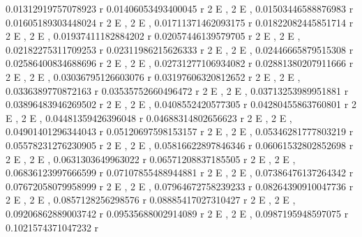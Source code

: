 \documentclass[a4paper,10pt]{article}
\begin{document}
\begin{eulernotebook}
\begin{eulercomment}
\begin{eulercomment}
\begin{eulercomment}
\begin{eulercomment}
\begin{eulercomment}
\begin{eulercomment}
\begin{eulercomment}
\begin{eulercomment}
\begin{eulercomment}
\begin{eulercomment}
\begin{eulercomment}
\begin{eulercomment}
\begin{eulercomment}
\begin{eulercomment}
\begin{eulercomment}
\begin{eulercomment}
\begin{eulercomment}
\begin{eulercomment}
\begin{eulercomment}
\begin{eulercomment}
\begin{eulercomment}
\begin{eulercomment}
\begin{eulercomment}
\begin{eulercomment}
\begin{euleroutput}
     0.01312919757078923 r     0.01406053493400045 r
  2 E                     , 2 E                     , 
     0.01503446588876983 r     0.01605189303448024 r
  2 E                     , 2 E                     , 
     0.01711371462093175 r     0.01822082445851714 r
  2 E                     , 2 E                     , 
     0.01937411182884202 r     0.02057446139579705 r
  2 E                     , 2 E                     , 
     0.02182275311709253 r     0.02311986215626333 r
  2 E                     , 2 E                     , 
     0.02446665879515308 r     0.02586400834688696 r
  2 E                     , 2 E                     , 
     0.02731277106934082 r     0.02881380207911666 r
  2 E                     , 2 E                     , 
     0.03036795126603076 r     0.03197606320812652 r
  2 E                     , 2 E                     , 
     0.0336389770872163 r     0.03535752660496472 r
  2 E                    , 2 E                     , 
     0.03713253989951881 r     0.03896483946269502 r
  2 E                     , 2 E                     , 
     0.0408552420577305 r     0.04280455863760801 r
  2 E                    , 2 E                     , 
     0.04481359426396048 r     0.04688314802656623 r
  2 E                     , 2 E                     , 
     0.04901401296344043 r     0.05120697598153157 r
  2 E                     , 2 E                     , 
     0.05346281777803219 r     0.05578231276230905 r
  2 E                     , 2 E                     , 
     0.05816622897846346 r     0.06061532802852698 r
  2 E                     , 2 E                     , 
     0.0631303649963022 r     0.06571208837185505 r
  2 E                    , 2 E                     , 
     0.06836123997666599 r     0.07107855488944881 r
  2 E                     , 2 E                     , 
     0.07386476137264342 r     0.07672058079958999 r
  2 E                     , 2 E                     , 
     0.07964672758239233 r     0.08264390910047736 r
  2 E                     , 2 E                     , 
     0.0857128256298576 r     0.08885417027310427 r
  2 E                    , 2 E                     , 
     0.09206862889003742 r     0.09535688002914089 r
  2 E                     , 2 E                     , 
     0.0987195948597075 r     0.1021574371047232 r

\end{euleroutput}
\end{eulercomment}
\end{eulercomment}
\end{eulercomment}
\end{eulercomment}
\end{eulercomment}
\end{eulercomment}
\end{eulercomment}
\end{eulercomment}
\end{eulercomment}
\end{eulercomment}
\end{eulercomment}
\end{eulercomment}
\end{eulercomment}
\end{eulercomment}
\end{eulercomment}
\end{eulercomment}
\end{eulercomment}
\end{eulercomment}
\end{eulercomment}
\end{eulercomment}
\end{eulercomment}
\end{eulercomment}
\end{eulercomment}
\end{eulercomment}
\end{eulernotebook}
\end{document}
